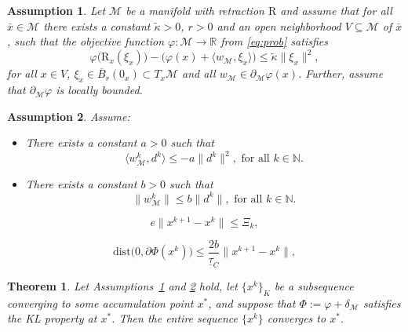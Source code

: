\documentclass[10pt,a4paper]{amsart}
\newtheorem{assumption}{Assumption}
\newtheorem{theorem}{Theorem}
\newcommand{\R}{\mathbb{R}}
\newcommand{\clball}{\overline{B}}
\newcommand{\dist}{\mathrm{dist}}
\newcommand{\dk}{d^k}
\newcommand{\retr}{\mathrm{R}}
\newcommand{\taug}{\underline{\tau}}
\newcommand{\wk}{w^k}
\newcommand{\xk}{x^k}
\newcommand{\xkp}{x^{k+1}}
\begin{document}
\begin{assumption}\label{descentas}
	Let $\mathcal{M}$ be a manifold with retraction $\retr$ and assume that for all $\bar x \in \mathcal{M}$ there exists a constant $\tilde \kappa > 0$, $r>0$ and an open neighborhood $V\subseteq \mathcal{M}$ of $\bar x$, such that the objective function $\varphi: \mathcal{M} \to \R$ from \eqref{eq:prob} satisfies
	\begin{equation}\label{eq:descentpropm}
		\varphi \big(\retr_x(\xi_x)\big) - \big(\varphi(x) + \langle w_\mathcal{M}, \xi_x \rangle\big) \leq \tilde \kappa \|\xi_x\|^2,
	\end{equation}
	for all $x \in V$, $\xi_x \in \clball_r(0_x) \subset T_x \mathcal{M}$ and all $w_\mathcal{M} \in \partial_\mathcal{M} \varphi(x)$. Further, assume that $\partial_\mathcal{M} \varphi$ is locally bounded.
\end{assumption}

\begin{assumption}\label{genas}
Assume:
\begin{itemize}
	\item[(a)] There exists a constant $a > 0$ such that 
		\begin{equation}\label{eq:wdbound1}
			\langle \wk_\mathcal{M}, \dk\rangle \leq - a \|\dk\|^2, \text{ for all } k \in \mathbb{N}.
		\end{equation}
	\item[(b)] There exists a constant $b >0$ such that
		\begin{equation}\label{eq:wdbound2}
			\|\wk_\mathcal{M}\| \leq b \|\dk\|, \text{ for all } k \in \mathbb{N}.
		\end{equation}
\end{itemize}
\end{assumption}

\begin{equation}\label{eq:normxi}
	e \|\xkp -\xk\| \leq \Xi_k,
\end{equation}

\begin{equation}\label{distbound}
	\dist \big( 0, \partial \Phi(\xk) \big) 
	\leq \frac{2 b}{\taug_C} \| \xkp - \xk\|,
\end{equation}

\begin{theorem}\label{thm:convergence}
Let Assumptions~\ref{descentas} and \ref{genas} hold, let $\{\xk\}_K$ be a subsequence converging to some accumulation point $x^*$, and suppose that $\Phi:= \varphi + \delta_\mathcal{M}$ satisfies the KL property at $x^*$. Then the entire sequence $\{\xk\}$ converges to $x^*$.
\end{theorem}
\end{document}
